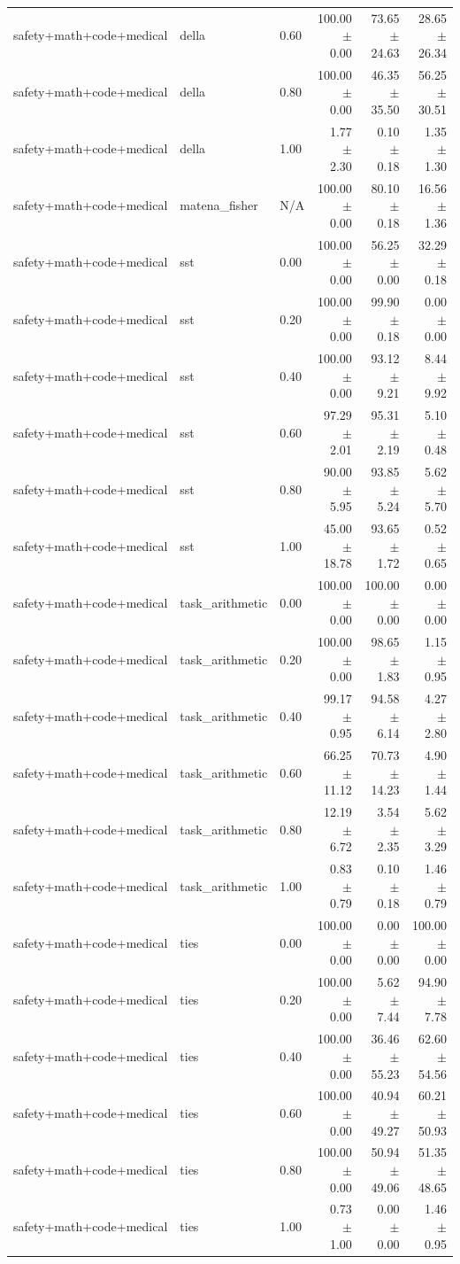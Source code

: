 \begin{table}[H]
{\begin{tabular}{lllrrr}
safety+math+code+medical & della & 0.60 & 100.00 $\pm$ 0.00 & 73.65 $\pm$ 24.63 & 28.65 $\pm$ 26.34 \\
safety+math+code+medical & della & 0.80 & 100.00 $\pm$ 0.00 & 46.35 $\pm$ 35.50 & 56.25 $\pm$ 30.51 \\
safety+math+code+medical & della & 1.00 & 1.77 $\pm$ 2.30 & 0.10 $\pm$ 0.18 & 1.35 $\pm$ 1.30 \\
safety+math+code+medical & matena\_fisher & N/A & 100.00 $\pm$ 0.00 & 80.10 $\pm$ 0.18 & 16.56 $\pm$ 1.36 \\
safety+math+code+medical & sst & 0.00 & 100.00 $\pm$ 0.00 & 56.25 $\pm$ 0.00 & 32.29 $\pm$ 0.18 \\
safety+math+code+medical & sst & 0.20 & 100.00 $\pm$ 0.00 & 99.90 $\pm$ 0.18 & 0.00 $\pm$ 0.00 \\
safety+math+code+medical & sst & 0.40 & 100.00 $\pm$ 0.00 & 93.12 $\pm$ 9.21 & 8.44 $\pm$ 9.92 \\
safety+math+code+medical & sst & 0.60 & 97.29 $\pm$ 2.01 & 95.31 $\pm$ 2.19 & 5.10 $\pm$ 0.48 \\
safety+math+code+medical & sst & 0.80 & 90.00 $\pm$ 5.95 & 93.85 $\pm$ 5.24 & 5.62 $\pm$ 5.70 \\
safety+math+code+medical & sst & 1.00 & 45.00 $\pm$ 18.78 & 93.65 $\pm$ 1.72 & 0.52 $\pm$ 0.65 \\
safety+math+code+medical & task\_arithmetic & 0.00 & 100.00 $\pm$ 0.00 & 100.00 $\pm$ 0.00 & 0.00 $\pm$ 0.00 \\
safety+math+code+medical & task\_arithmetic & 0.20 & 100.00 $\pm$ 0.00 & 98.65 $\pm$ 1.83 & 1.15 $\pm$ 0.95 \\
safety+math+code+medical & task\_arithmetic & 0.40 & 99.17 $\pm$ 0.95 & 94.58 $\pm$ 6.14 & 4.27 $\pm$ 2.80 \\
safety+math+code+medical & task\_arithmetic & 0.60 & 66.25 $\pm$ 11.12 & 70.73 $\pm$ 14.23 & 4.90 $\pm$ 1.44 \\
safety+math+code+medical & task\_arithmetic & 0.80 & 12.19 $\pm$ 6.72 & 3.54 $\pm$ 2.35 & 5.62 $\pm$ 3.29 \\
safety+math+code+medical & task\_arithmetic & 1.00 & 0.83 $\pm$ 0.79 & 0.10 $\pm$ 0.18 & 1.46 $\pm$ 0.79 \\
safety+math+code+medical & ties & 0.00 & 100.00 $\pm$ 0.00 & 0.00 $\pm$ 0.00 & 100.00 $\pm$ 0.00 \\
safety+math+code+medical & ties & 0.20 & 100.00 $\pm$ 0.00 & 5.62 $\pm$ 7.44 & 94.90 $\pm$ 7.78 \\
safety+math+code+medical & ties & 0.40 & 100.00 $\pm$ 0.00 & 36.46 $\pm$ 55.23 & 62.60 $\pm$ 54.56 \\
safety+math+code+medical & ties & 0.60 & 100.00 $\pm$ 0.00 & 40.94 $\pm$ 49.27 & 60.21 $\pm$ 50.93 \\
safety+math+code+medical & ties & 0.80 & 100.00 $\pm$ 0.00 & 50.94 $\pm$ 49.06 & 51.35 $\pm$ 48.65 \\
safety+math+code+medical & ties & 1.00 & 0.73 $\pm$ 1.00 & 0.00 $\pm$ 0.00 & 1.46 $\pm$ 0.95 \\
\bottomrule
\end{tabular}
}
\end{table}